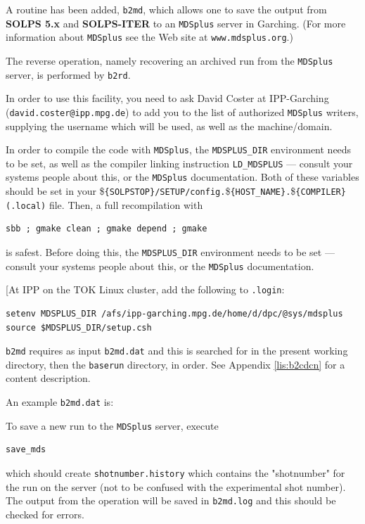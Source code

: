 \documentclass[a4paper,10pt]{report}
\newcommand\SOLPSfive{{\bf SOLPS 5.x} }
\newcommand\SOLPSITER{{\bf SOLPS-ITER} }
\begin{document}
A routine has been added, {\tt b2md}, which allows one to save
the output from \SOLPSfive and \SOLPSITER to an {\tt MDSplus} server in Garching.  (For more
information about {\tt MDSplus} see the Web site at {\tt www.mdsplus.org}.)

The reverse operation, namely recovering an archived run from the {\tt MDSplus}
server, is performed by {\tt b2rd}.

In order to use this facility, you need to ask David Coster at IPP-Garching
({\tt david.coster@ipp.mpg.de}) to
add you to the list of authorized {\tt MDSplus} writers, supplying the username
which will be used, as well as the machine/domain.

In order to compile the code with {\tt MDSplus}, the {\tt MDSPLUS\_DIR} environment
needs to be set, as well as the compiler linking instruction {\tt LD\_MDSPLUS} ---
consult your systems people about this, or the
{\tt MDSplus} documentation. Both of these variables should be set in your
\${\tt \{SOLPSTOP\}/SETUP/config.}\${\tt \{HOST\_NAME\}.}\${\tt \{COMPILER\}(.local)} file.
Then, a full recompilation with
\begin{verbatim}
sbb ; gmake clean ; gmake depend ; gmake
\end{verbatim}
is safest.  Before doing this, the {\tt MDSPLUS\_DIR} environment
needs to be set --- consult your systems people about this, or the
{\tt MDSplus} documentation.

[At IPP on the TOK Linux cluster, add the following to {\tt .login}:
\begin{verbatim}
setenv MDSPLUS_DIR /afs/ipp-garching.mpg.de/home/d/dpc/@sys/mdsplus
source $MDSPLUS_DIR/setup.csh
\end{verbatim}

{\tt b2md} requires as input {\tt b2md.dat} and this is searched for in the
present working directory, then the {\tt baserun} directory, in order.
See Appendix \ref{lis:b2cdcn} for a content description.

An example {\tt b2md.dat} is:

To save a new run to the {\tt MDSplus} server, execute
\begin{verbatim}
save_mds
\end{verbatim}
which should create {\tt shotnumber.history} which contains the
"shotnumber" for the run on the server (not to be confused with the
experimental shot number).  The output from the operation will be saved in
{\tt b2md.log} and this should be checked for errors.
\end{document}
